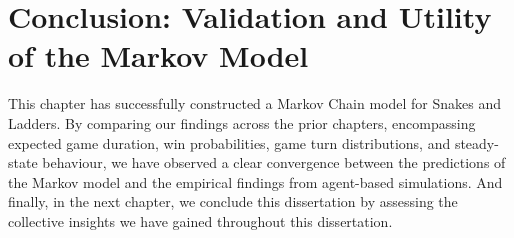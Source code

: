 \section{Conclusion: Validation and Utility of the Markov Model}

This chapter has successfully constructed a Markov Chain model for Snakes and Ladders. By comparing our findings across the prior chapters, encompassing expected game duration, win probabilities, game turn distributions, and steady-state behaviour, we have observed a clear convergence between the predictions of the Markov model and the empirical findings from agent-based simulations. And finally, in the next chapter, we conclude this dissertation by assessing the collective insights we have gained throughout this dissertation. 